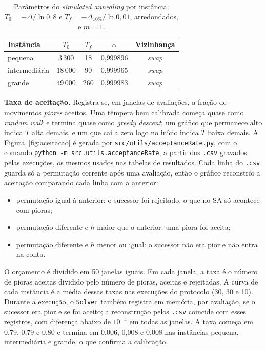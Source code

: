\begin{table}[H]
\centering
\caption{Parâmetros do \textit{simulated annealing} por instância: $T_0=-\bar\Delta/\ln 0{,}8$ e $T_f=-\Delta_{10\%}/\ln 0{,}01$, arredondados, e $m=1$.}
\label{tab:par-sa}
\small
\begin{tabular}{lcccc}
\toprule
Instância & $T_0$ & $T_f$ & $\alpha$ & Vizinhança\\
\midrule
pequena       & 3\,300  & 18  & 0{,}999896 & \textit{swap}\\
intermediária & 18\,000 & 90  & 0{,}999965 & \textit{swap}\\
grande        & 49\,000 & 260 & 0{,}999983 & \textit{swap}\\
\bottomrule
\end{tabular}
\end{table}

\textbf{Taxa de aceitação.} Registra-se, em janelas de avaliações, a fração de movimentos \textit{piores} aceitos. Uma têmpera bem calibrada começa quase como \textit{random walk} e termina quase como \textit{greedy descent}; um gráfico que permanece alto indica $T$ alta demais, e um que cai a zero logo no início indica $T$ baixa demais. A Figura~\ref{fig:aceitacao} é gerada por \texttt{src/\allowbreak utils/\allowbreak acceptanceRate.py}, com o comando \texttt{python -m src.utils.\allowbreak acceptanceRate}, a partir dos \texttt{.csv} gravados pelas execuções, os mesmos usados nas tabelas de resultados. Cada linha do \texttt{.csv} guarda só a permutação corrente após uma avaliação, então o gráfico reconstrói a aceitação comparando cada linha com a anterior:

\begin{itemize}
  \item permutação igual à anterior: o sucessor foi rejeitado, o que no SA só acontece com pioras;
  \item permutação diferente e $h$ maior que o anterior: uma piora foi aceita;
  \item permutação diferente e $h$ menor ou igual: o sucessor não era pior e não entra na conta.
\end{itemize}

O orçamento é dividido em 50 janelas iguais. Em cada janela, a taxa é o número de pioras aceitas dividido pelo número de pioras, aceitas e rejeitadas. A curva de cada instância é a média dessas taxas nas execuções do protocolo (30, 30 e 10). Durante a execução, o \texttt{Solver} também registra em memória, por avaliação, se o sucessor era pior e se foi aceito; a reconstrução pelos \texttt{.csv} coincide com esses registros, com diferença abaixo de $10^{-4}$ em todas as janelas. A taxa começa em 0{,}79, 0{,}79 e 0{,}80 e termina em 0{,}006, 0{,}008 e 0{,}008 nas instâncias pequena, intermediária e grande, o que confirma a calibração.


